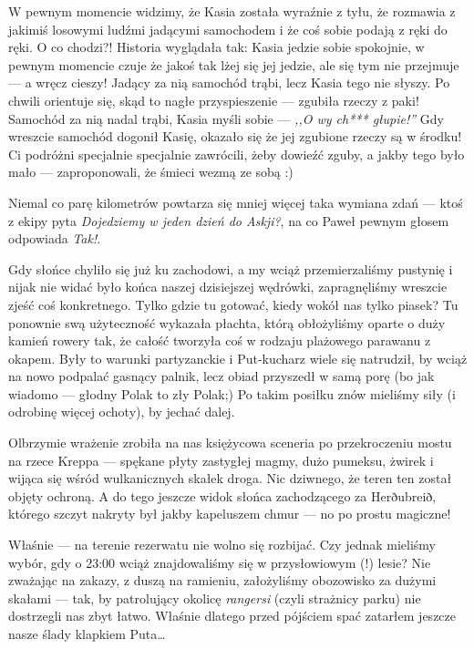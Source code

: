
W pewnym momencie widzimy, że Kasia została wyraźnie z tyłu, że rozmawia z jakimiś losowymi ludźmi jadącymi samochodem i że coś sobie podają z ręki do ręki. O co chodzi?! Historia wyglądała tak: Kasia jedzie sobie spokojnie, w pewnym momencie czuje że jakoś tak lżej się jej jedzie, ale się tym nie przejmuje --- a wręcz cieszy! Jadący za nią samochód trąbi, lecz Kasia tego nie słyszy. Po chwili orientuje się, skąd to nagłe przyspieszenie --- zgubiła rzeczy z paki! Samochód za nią nadal trąbi, Kasia myśli sobie --- \emph{,,O wy ch*** głupie!''} Gdy wreszcie samochód dogonił Kasię, okazało się że jej zgubione rzeczy są w środku! Ci podróżni specjalnie specjalnie zawrócili, żeby dowieźć zguby, a jakby tego było mało --- zaproponowali, że śmieci wezmą ze sobą :)

Niemal co parę kilometrów powtarza się mniej więcej taka wymiana zdań --- ktoś z ekipy pyta \emph{Dojedziemy w jeden dzień do Askji?}, na co Paweł pewnym głosem odpowiada \emph{Tak!}.


Gdy słońce chyliło się już ku zachodowi, a my wciąż przemierzaliśmy pustynię i nijak nie widać było końca naszej dzisiejszej wędrówki, zapragnęliśmy wreszcie zjeść coś konkretnego. Tylko gdzie tu gotować, kiedy wokół nas tylko piasek? Tu ponownie swą użyteczność wykazała płachta, którą obłożyliśmy oparte o duży kamień rowery tak, że całość tworzyła coś w rodzaju plażowego parawanu z okapem. Były to warunki partyzanckie i Put-kucharz wiele się natrudził, by wciąż na nowo podpalać gasnący palnik, lecz obiad przyszedł w samą porę (bo jak wiadomo --- głodny Polak to zły Polak;) Po takim posiłku znów mieliśmy siły (i odrobinę więcej ochoty), by jechać dalej.

Olbrzymie wrażenie zrobiła na nas księżycowa sceneria po przekroczeniu mostu na rzece Kreppa --- spękane płyty zastygłej magmy, dużo pumeksu, żwirek i wijąca się wśród wulkanicznych skałek droga. Nic dziwnego, że teren ten został objęty ochroną. A do tego jeszcze widok słońca zachodzącego za Herðubreið, którego szczyt nakryty był jakby kapeluszem chmur --- no po prostu magiczne!

Właśnie --- na terenie rezerwatu nie wolno się rozbijać. Czy jednak mieliśmy wybór, gdy o 23:00 wciąż znajdowaliśmy się w przysłowiowym (!) lesie? Nie zważając na zakazy, z duszą na ramieniu, założyliśmy obozowisko za dużymi skałami --- tak, by patrolujący okolicę \emph{rangersi} (czyli strażnicy parku) nie dostrzegli nas zbyt łatwo. Właśnie dlatego przed pójściem spać zatarłem jeszcze nasze ślady klapkiem Puta…

